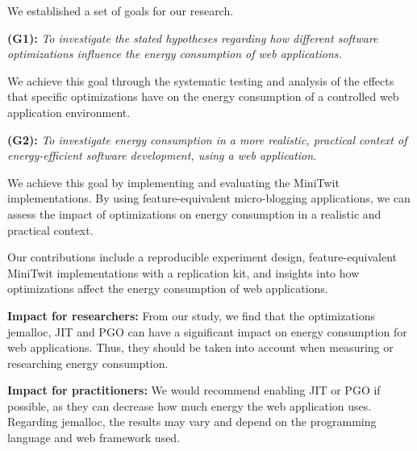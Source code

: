 \documentclass[main.tex]{subfiles}
\begin{document}
We established a set of goals for our research.

\textbf{(G1):} \emph{To investigate the stated hypotheses regarding how different software optimizations influence the energy consumption of web applications.}

    We achieve this goal through the systematic testing and analysis of the effects that specific optimizations have on the energy consumption of a controlled web application environment.

\textbf{(G2):} \emph{To investigate energy consumption in a more realistic, practical context of energy-efficient software development, using a web application.}

    We achieve this goal by implementing and evaluating the MiniTwit implementations. By using feature-equivalent micro-blogging applications, we can assess the impact of optimizations on energy consumption in a realistic and practical context.

Our contributions include a reproducible experiment design, feature-equivalent MiniTwit implementations with a replication kit, and insights into how optimizations affect the energy consumption of web applications.

\textbf{Impact for researchers:} From our study, we find that the optimizations jemalloc, JIT and PGO can have a significant impact on energy consumption for web applications. Thus, they should be taken into account when measuring or researching energy consumption. 

\textbf{Impact for practitioners:} We would recommend enabling JIT or PGO if possible, as they can decrease how much energy the web application uses. Regarding jemalloc, the results may vary and depend on the programming language and web framework used.
\end{document}
